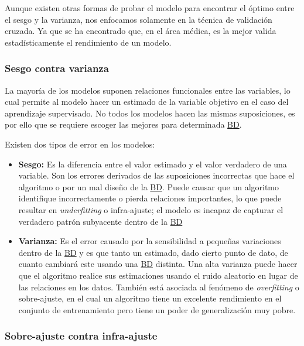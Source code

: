 Aunque existen otras formas de probar el modelo para encontrar el óptimo entre
el sesgo y la varianza, nos enfocamos solamente en la técnica de validación
cruzada. Ya que se ha encontrado que, en el área médica, es la mejor valida
estadísticamente el rendimiento de un modelo.~\cite{Ambroise2002}

\subsubsection{Sesgo contra varianza}

La mayoría de los modelos suponen relaciones funcionales entre las variables, lo
cual permite al modelo hacer un estimado de la variable objetivo en el caso del
aprendizaje supervisado. No todos los modelos hacen las mismas suposiciones, es
por ello que se requiere escoger las mejores para determinada
\hyperlink{abbr}{BD}.

Existen dos tipos de error en los modelos:

\begin{itemize}
    \item{\textbf{Sesgo: }} Es la diferencia entre el valor estimado y el valor
    verdadero de una variable. Son los errores derivados de las suposiciones
    incorrectas que hace el algoritmo o por un mal diseño de la
    \hyperlink{abbr}{BD}. Puede causar que un algoritmo identifique
    incorrectamente o pierda relaciones importantes, lo que puede resultar en
    \emph{underfitting} o infra-ajuste; el modelo es
    incapaz de capturar el verdadero patrón subyacente dentro de la
    \hyperlink{abbr}{BD}
    \item{\textbf{Varianza: }} Es el error causado por la sensibilidad a
    pequeñas variaciones dentro de la \hyperlink{abbr}{BD} y es que tanto un
    estimado, dado cierto punto de dato, de cuanto cambiará este usando una
    \hyperlink{abbr}{BD} distinta. Una alta varianza puede hacer que el
    algoritmo realice sus estimaciones usando el ruido aleatorio en lugar de las
    relaciones en los datos. También está asociada al fenómeno de
    \emph{overfitting} o sobre-ajuste, en el cual un
    algoritmo tiene un excelente rendimiento en el conjunto de entrenamiento
    pero tiene un poder de generalización muy pobre.
\end{itemize}

\subsubsection{Sobre-ajuste contra infra-ajuste}

